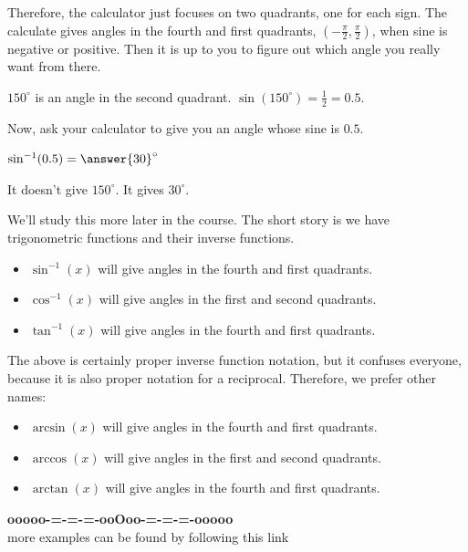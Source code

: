 \documentclass{ximera}
\begin{document}
Therefore, the calculator just focuses on two quadrants, one for each sign.  The calculate gives angles in the fourth  and first quadrants, $\left( -\frac{\pi}{2}, \frac{\pi}{2}   \right)$, when sine is negative or positive.  Then it is up to you to figure out which angle you really want from there.












\begin{question} 


$150^{\circ}$ is an angle in the second quadrant. $\sin(150^{\circ}) = \frac{1}{2} = 0.5$.


Now, ask your calculator to give you an angle whose sine is $0.5$.


$\sin^{-1}(0.5) = \answer{30}^{\circ}$


It doesn't give $150^{\circ}$.  It gives $30^{\circ}$.

\end{question}




We'll study this more later in the course.  The short story is we have trigonometric functions and their inverse functions.




\begin{itemize}
\item $\sin^{-1}(x)$ will give angles in the fourth and first quadrants.
\item $\cos^{-1}(x)$ will give angles in the first and second quadrants.
\item $\tan^{-1}(x)$ will give angles in the fourth and first quadrants.
\end{itemize}


The above is certainly proper inverse function notation, but it confuses everyone, because it is also proper notation for a reciprocal.  Therefore, we prefer other names:




\begin{itemize}
\item $\arcsin(x)$ will give angles in the fourth and first quadrants.
\item $\arccos(x)$ will give angles in the first and second quadrants.
\item $\arctan(x)$ will give angles in the fourth and first quadrants.
\end{itemize}




\begin{onlineOnly}
\begin{center}
\textbf{\textcolor{green!50!black}{ooooo-=-=-=-ooOoo-=-=-=-ooooo}} \\

more examples can be found by following this link\\ 

\end{center}
\end{onlineOnly}
\end{document}
